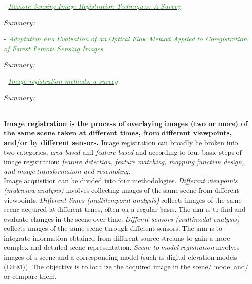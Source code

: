 \documentclass[]{article}
\newcommand{\paperentry}[4]{
            \hangindent=1cm
            \cite{#1} - \href{run:../References/#3}{\textcolor{ForestGreen}{\textit{#2}}}
            
            \noindent            
            \begin{minipage}[t]{0.1\linewidth}\hfill\end{minipage}
            \begin{minipage}[t]{0.8\linewidth}\textcolor{NavyBlue}{{\textit{Summary:}}}#4\end{minipage}
            \vspace{.25cm}
          }
\begin{document}
		\paperentry{Dawn2010SurveyRemoteSensingImageRegistration}
		{Remote Sensing Image Registration Techniques: A Survey}
		{Fusion/Dawn2010SurveyRemoteSensingImageRegistration.pdf}
		{}
	
		\paperentry{Brigot2016CoregistrationForestRemoteSensingImages}
		{Adaptation and Evaluation of an Optical Flow Method Applied to Coregistration of Forest Remote Sensing Images}
		{Fusion/Brigot2016CoregistrationForestRemoteSensingImages.pdf}
		{}
		
		\paperentry{Zitova2003SurveyImageRegistrationMethods}
		{Image registration methods: a survey}
		{Fusion/Reviews/Zitova2003SurveyImageRegistrationMethods.pdf}
		{}\\
		\textbf{Image registration is the process of overlaying images (two or more) of the same scene taken at different times, from different viewpoints, and/or by different sensors.}  Image registration can broadly be broken into two categories, \textit{area-based} and \textit{feature-based} and according to four basic steps of image registration: \textit{feature detection, feature matching, mapping function design, and image transformation and resampling.} \\
		\noindent
		Image acquisition can be divided into four methodologies.  \textit{Different viewpoints (multiview analysis)} involves collecting images of the same scene from different viewpoints.  \textit{Different times (multitemporal analysis)} collects images of the same scene acquired at different times, often on a regular basis.  The aim  is to find and  evaluate changes in the scene over time.  \textit{Differnt sensors (multimodal analysis)} collects images of the same scene through different sensors.  The aim is to integrate information obtained from different source streams to gain a more complex and detailed scene representation.  \textit{Scene to model registration} involves images of a scene and a corresponding model (such as digital elevation models (DEM)).  The objective is to localize the acquired image in the scene/ model and/ or compare them.\\
		\noindent
\end{document}
